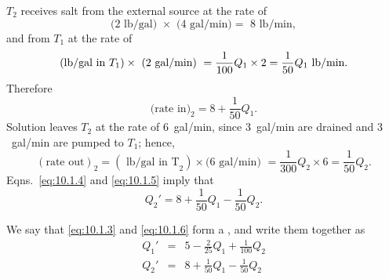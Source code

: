 \documentclass{ximera}
\begin{document}
\begin{example}
\begin{explanation}
$T_2$ receives salt from the external source at the rate of
$$
\mbox{(2 lb/gal) }\times\mbox{ (4~gal/min)}=\mbox{ 8 lb/min},
$$
and from $T_1$ at the rate of
$$
\mbox{(lb/gal in }T_1)\times\mbox{ (2~gal/min)
}=\frac{1}{100}Q_1\times 2\\=\frac{1}{50}Q_1 \mbox{ lb/min}.
$$
Therefore
\begin{equation} \label{eq:10.1.4}
\mbox{(rate in)}_2= 8+\frac{1}{50}Q_1.
\end{equation}
Solution leaves $T_2$  at the rate of $6$~gal/min, since $3$~gal/min are
drained and $3$~gal/min are pumped to $T_1$; hence,
\begin{equation} \label{eq:10.1.5}
(\mbox{rate out})_2=(\mbox{ lb/gal in T}_2)\times \mbox{(6~gal/min) }
=\frac{1}{300}Q_2\times6=\frac{1}{50}Q_2.
\end{equation}
Eqns.~\eqref{eq:10.1.4} and \eqref{eq:10.1.5} imply that
\begin{equation} \label{eq:10.1.6}
Q_2'=8+\frac{1}{50}Q_1-\frac{1}{50}Q_2.
\end{equation}

We say that \eqref{eq:10.1.3} and \eqref{eq:10.1.6}  form a , and write them together as
\begin{eqnarray*}
Q_1'&=&5-\frac{2}{25}Q_1+\frac{1}{100}Q_2\\
Q_2'&=&8+\frac{1}{50}Q_1-\frac{1}{50}Q_2
\end{eqnarray*}

\end{explanation}
\end{example}
\end{document}
